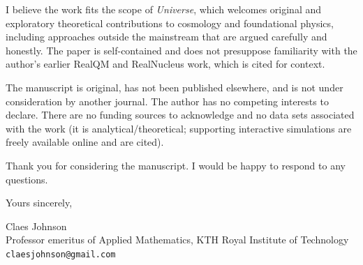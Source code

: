 \documentclass[11pt]{article}
\begin{document}
I believe the work fits the scope of \emph{Universe}, which welcomes original and exploratory theoretical
contributions to cosmology and foundational physics, including approaches outside the mainstream that are argued
carefully and honestly. The paper is self-contained and does not presuppose familiarity with the author's earlier
RealQM and RealNucleus work, which is cited for context.

The manuscript is original, has not been published elsewhere, and is not under consideration by another journal.
The author has no competing interests to declare. There are no funding sources to acknowledge and no data sets
associated with the work (it is analytical/theoretical; supporting interactive simulations are freely available
online and are cited).

Thank you for considering the manuscript. I would be happy to respond to any questions.

\bigskip
\noindent Yours sincerely,

\medskip
\noindent Claes Johnson \\
Professor emeritus of Applied Mathematics, KTH Royal Institute of Technology \\
\texttt{claesjohnson@gmail.com}
\end{document}
